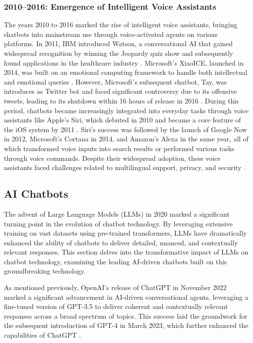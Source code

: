 \subsubsection{2010–2016: Emergence of Intelligent Voice Assistants}

The years 2010 to 2016 marked the rise of intelligent voice assistants, bringing chatbots into mainstream use through voice-activated agents on various platforms. In 2011, IBM introduced Watson, a conversational AI that gained widespread recognition by winning the Jeopardy quiz show and subsequently found applications in the healthcare industry \cite{chen2016ibm}. Microsoft's XiaoICE, launched in 2014, was built on an emotional computing framework to handle both intellectual and emotional queries \cite{zhou2020design}. However, Microsoft's subsequent chatbot, Tay, was introduces as Twitter bot and faced significant controversy due to its offensive tweets, leading to its shutdown within 16 hours of release in 2016 \cite{hoy2018alexa}. During this period, chatbots became increasingly integrated into everyday tasks through voice assistants like Apple's Siri, which debuted in 2010 and became a core feature of the iOS system by 2011 \cite{aron2011innovative}. Siri's success was followed by the launch of Google Now in 2012, Microsoft's Cortana in 2014, and Amazon's Alexa in the same year, all of which transformed voice inputs into search results or performed various tasks through voice commands. Despite their widespread adoption, these voice assistants faced challenges related to multilingual support, privacy, and security \cite{bolton2021security}.

\subsection{AI Chatbots}

The advent of Large Language Models (LLMs) in 2020 marked a significant turning point in the evolution of chatbot technology. By leveraging extensive training on vast datasets using pre-trained transformers, LLMs have dramatically enhanced the ability of chatbots to deliver detailed, nuanced, and contextually relevant responses. This section delves into the transformative impact of LLMs on chatbot technology, examining the leading AI-driven chatbots built on this groundbreaking technology.

As mentioned previously, OpenAI’s release of ChatGPT in November 2022 marked a significant advancement in AI-driven conversational agents, leveraging a fine-tuned version of GPT-3.5 to deliver coherent and contextually relevant responses across a broad spectrum of topics. This success laid the groundwork for the subsequent introduction of GPT-4 in March 2023, which further enhanced the capabilities of ChatGPT \cite{wikipedia2023chatgpt}.

